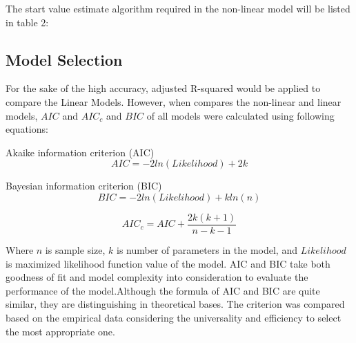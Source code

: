 \documentclass[11pt]{article}
\begin{document}
    The start value estimate algorithm required in the non-linear model will be listed in table 2:

    \begin{table}[H]
      \centering
      \caption{The algorithms to estimate the start value}
    \end{table}
    
    
\subsection{Model Selection}
\linenumbers
  For the sake of the high accuracy, adjusted R-squared would be applied to compare the Linear Models\cite{chicco_coefficient_2021}. However, when compares the non-linear and linear models, $AIC$ and $AIC_c$ and $BIC$ of all models were calculated using following equations\cite{kuha_aic_2004,wagenmakers_aic_2004}: 
 
  Akaike information criterion (AIC) 
  \begin{equation} 
  AIC = -2ln(Likelihood) + 2k
  \end{equation} 

  Bayesian information criterion (BIC)
  \begin{equation} 
  BIC = -2ln(Likelihood) + kln(n) 
  \end{equation} 

  \begin{equation} 
  AIC_c = AIC + \frac{2k(k+1)}{n-k-1}
  \end{equation} 
 
  Where $n$ is sample size, $k$ is number of parameters in the model, and $Likelihood$ is maximized likelihood function value of the model. AIC and BIC take both goodness of fit and model complexity into consideration to evaluate the performance of the model\cite{kuha_aic_2004}.Although the formula of AIC and BIC are quite similar, they are distinguishing in theoretical bases\cite{kuha_aic_2004}. The criterion was compared based on the empirical data considering the universality and efficiency to select the most appropriate one. 
\end{document}
